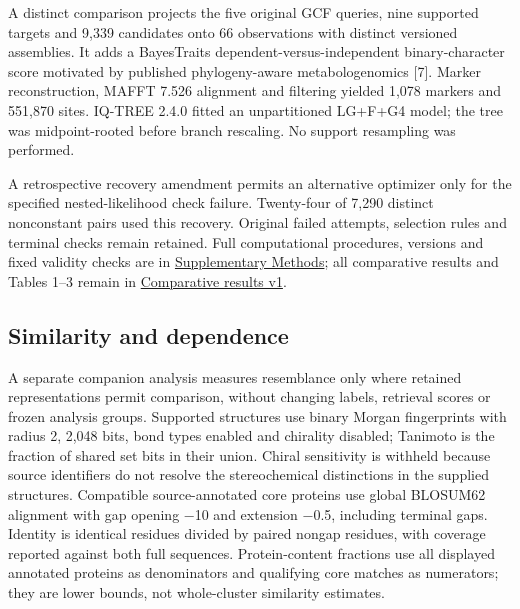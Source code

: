 \documentclass[
  10pt,
  a4paper,
]{article}
\begin{document}
A distinct comparison projects the five original GCF queries, nine supported targets and 9,339 candidates onto 66 observations with distinct versioned assemblies. It adds a BayesTraits dependent-versus-independent binary-character score motivated by published phylogeny-aware metabologenomics {[}7{]}. Marker reconstruction, MAFFT 7.526 alignment and filtering yielded 1,078 markers and 551,870 sites. IQ-TREE 2.4.0 fitted an unpartitioned LG+F+G4 model; the tree was midpoint-rooted before branch rescaling. No support resampling was performed.

A retrospective recovery amendment permits an alternative optimizer only for the specified nested-likelihood check failure. Twenty-four of 7,290 distinct nonconstant pairs used this recovery. Original failed attempts, selection rules and terminal checks remain retained. Full computational procedures, versions and fixed validity checks are in \href{Supplementary-Methods.pdf}{Supplementary Methods}; all comparative results and Tables 1--3 remain in \href{Comparative-results.pdf}{Comparative results v1}.

\subsection{Similarity and dependence}\label{similarity-and-dependence}

A separate companion analysis measures resemblance only where retained representations permit comparison, without changing labels, retrieval scores or frozen analysis groups. Supported structures use binary Morgan fingerprints with radius 2, 2,048 bits, bond types enabled and chirality disabled; Tanimoto is the fraction of shared set bits in their union. Chiral sensitivity is withheld because source identifiers do not resolve the stereochemical distinctions in the supplied structures. Compatible source-annotated core proteins use global BLOSUM62 alignment with gap opening −10 and extension −0.5, including terminal gaps. Identity is identical residues divided by paired nongap residues, with coverage reported against both full sequences. Protein-content fractions use all displayed annotated proteins as denominators and qualifying core matches as numerators; they are lower bounds, not whole-cluster similarity estimates.
\end{document}

